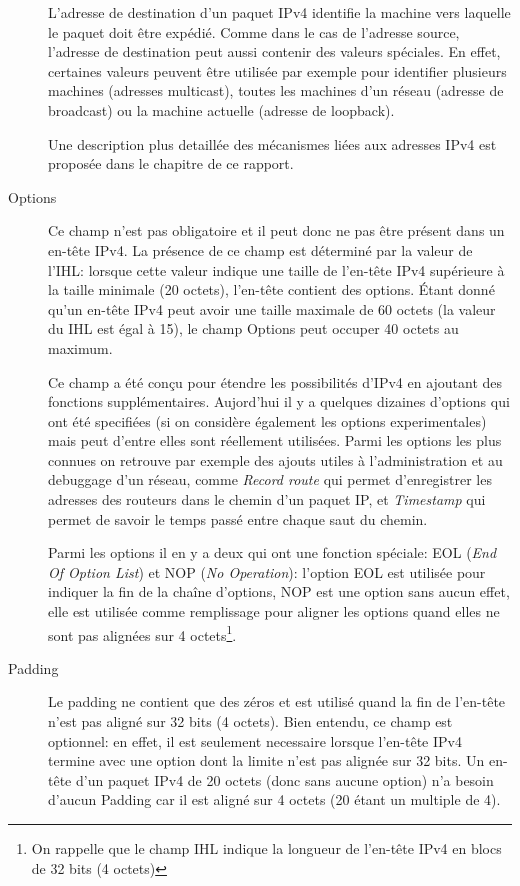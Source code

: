 \begin{description}
L'adresse de destination d'un paquet IPv4 identifie la machine vers
laquelle le paquet doit être expédié. Comme dans le cas de l'adresse source,
 l'adresse de destination peut aussi contenir des valeurs spéciales. En effet, certaines 
valeurs peuvent être utilisée par exemple pour identifier plusieurs machines
(adresses multicast), toutes les machines d'un réseau (adresse de broadcast) ou
la machine actuelle (adresse de loopback).

Une description plus detaillée des mécanismes liées aux adresses IPv4 est
proposée dans le chapitre  
de ce rapport.


\item [Options] 
Ce champ n'est pas obligatoire et il peut donc ne pas être présent dans un
en-tête IPv4. La présence de ce champ est déterminé par la valeur de
l'IHL: lorsque cette valeur indique une taille de l'en-tête IPv4 supérieure à 
la taille minimale (20 octets), l'en-tête contient des options.
Étant donné qu'un en-tête IPv4 peut avoir une taille maximale de 
60 octets (la valeur du IHL est égal à 15), le champ Options peut occuper
40 octets au maximum.

Ce champ a été conçu pour étendre les possibilités d'IPv4 en ajoutant des fonctions
supplémentaires.  Aujord'hui il y a quelques dizaines d'options qui ont été
specifiées\cite{url-optsIPv4} (si on considère également les options experimentales)
mais peut d'entre elles sont réellement utilisées. Parmi les options les plus connues
on retrouve par exemple des ajouts utiles à l'administration et au debuggage
d'un réseau, comme {\it Record route} qui permet d'enregistrer les adresses
des routeurs dans le chemin d'un paquet IP, et {\it Timestamp} qui permet de
savoir le temps passé entre chaque saut du chemin.

Parmi les options il en y a deux qui ont une fonction spéciale: EOL 
({\it End Of Option List}) et NOP ({\it No Operation}): l'option EOL 
est utilisée pour indiquer la fin de la chaîne d'options, NOP est une option
sans aucun effet, elle est utilisée comme remplissage pour aligner les options 
quand elles ne sont pas alignées sur 4 octets\footnote {On rappelle que 
le champ IHL indique la longueur de l'en-tête IPv4 en blocs de 32 bits 
(4 octets)}.



\item [Padding] 
Le padding ne contient que des zéros et est utilisé quand la fin de l'en-tête
n'est pas aligné sur 32 bits (4 octets). Bien entendu, ce champ est optionnel:
en effet, il est seulement necessaire lorsque l'en-tête IPv4 termine avec
une option dont la limite n'est pas alignée sur 32 bits. Un en-tête d'un paquet IPv4 
de 20 octets (donc sans aucune option) n'a besoin d'aucun Padding car il est aligné sur
4 octets (20 étant un multiple de 4).
\end{description}

